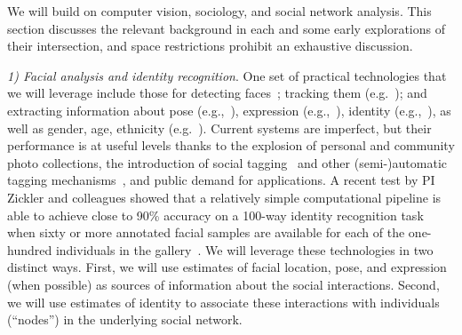 
We will build on computer vision, sociology, and social network analysis. This section discusses the relevant background in each and some early explorations of their intersection, and space restrictions prohibit an exhaustive discussion. %


\emph{1) Facial analysis and identity recognition}. One set of practical technologies that we will leverage include those for detecting faces~\cite{ViolaJones,Zhang:detect}; tracking them (e.g.~\cite{Comaniciu:track}); and extracting information about pose (e.g.,~\cite{Hanson,Murphy-Chutorian:pose}), expression (e.g.,~\cite{Matthews:AAM,Lucey:AAM,Mumford:face,Yacoob:expression,delaTorre:expression,Essa:expression}), identity (e.g.,~\cite{Chellappa:face}), as well as gender, age, ethnicity (e.g.~\cite{LNCS53050340}).  Current systems are imperfect, but their performance is at useful levels thanks to the explosion of personal and community photo collections, the introduction of social tagging~\cite{Stone2008,Stone2010} and other (semi-)automatic tagging mechanisms~\cite{berg2004naf,berg2005sp,Everingham06a,huang:lfw,YangBKR12}, and public demand for applications. A recent test by PI Zickler and colleagues showed that a relatively simple computational pipeline is able to achieve close to 90\% accuracy on a 100-way identity recognition task when sixty or more annotated facial samples are available for each of the one-hundred individuals in the gallery~\cite{PintoZickler2011}. We will leverage these technologies in two distinct ways. First, we will use estimates of facial location, pose, and expression (when possible) as sources of information about the social interactions. Second, we will use estimates of identity to associate these interactions with individuals (``nodes'') in the underlying social network. 




